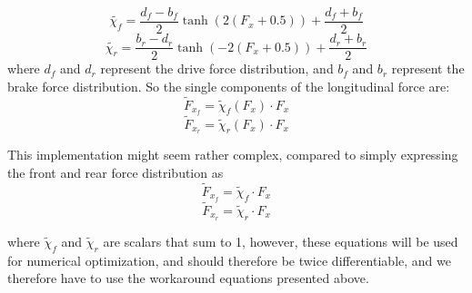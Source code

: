 \documentclass[a4paper, onecolumn, 11pt, twoside]{article}
\begin{document}
\begin{equation}
    \tilde{\chi_f} = \frac{d_f - b_f}{2}\tanh(2(F_x+0.5))+\frac{d_f+b_f}{2}
\end{equation}
\begin{equation}
    \tilde{\chi_r} = \frac{b_r-d_r}{2}\tanh(-2(F_x+0.5))+\frac{d_r+b_r}{2}
\end{equation}
where $d_f$ and $d_r$ represent the drive force distribution, and $b_f$ and $b_r$ represent the 
brake force distribution. So the single components of the longitudinal force are:
\begin{equation}
    \tilde{F}_{x_f} = \tilde{\chi}_f(F_x) \cdot F_x
\end{equation}
\begin{equation}
    \tilde{F}_{x_r} = \tilde{\chi}_r(F_x) \cdot F_x
\end{equation}

This implementation might seem rather complex, compared to simply expressing the front and rear force distribution as
\begin{equation}
    \tilde{F}_{x_f} = \tilde{\chi}_f \cdot F_x
\end{equation}
\begin{equation}
    \tilde{F}_{x_r} = \tilde{\chi}_r \cdot F_x
\end{equation}

where $\tilde{\chi}_f$ and $\tilde{\chi}_r$ are scalars that sum to 1, however, these equations will be used for numerical 
optimization, and should therefore be twice differentiable, and we therefore have to use the workaround equations presented above.
\end{document}
